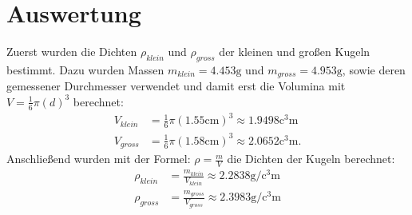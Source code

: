 \section{Auswertung}
\label{sec:Auswertung}

Zuerst wurden die Dichten $\rho_{klein}$ und $\rho_{gross}$ der kleinen und großen Kugeln bestimmt. Dazu wurden Massen
$m_{klein} = 4.453\unit{\gram}$ und $m_{gross} = 4.953 \unit{\gram}$, sowie deren gemessener Durchmesser verwendet und
damit erst die Volumina mit $V = \frac{1}{6}\pi\left(d\right)^3$ berechnet:
\begin{align*}
  V_{klein} &= \frac{1}{6}\pi\left(1.55\unit{\centi\meter}\right)^3 \approx 1.9498\unit{\cubic\centi\meter}\\
  V_{gross} &= \frac{1}{6}\pi\left(1.58\unit{\centi\meter}\right)^3 \approx 2.0652\unit{\cubic\centi\meter}.
\end{align*}
Anschließend wurden mit der Formel: $\rho = \frac{m}{V}$ die Dichten der Kugeln berechnet:
\begin{align*}
  \rho_{klein} &= \frac{m_{klein}}{V_{klein}} \approx 2.2838\unit{\gram\per\cubic\centi\meter}\\
  \rho_{gross} &= \frac{m_{gross}}{V_{gross}} \approx 2.3983\unit{\gram\per\cubic\centi\meter}
\end{align*}